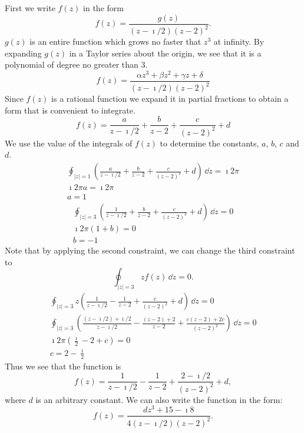 {%
\begin{Solution}
  \label{solution int f = i 2 pi}
  First we write $f(z)$ in the form
  \[
  f(z) = \frac{g(z)}{(z - \imath / 2) (z - 2)^2 }.
  \]
  $g(z)$ is an entire function which grows no faster that $z^3$ at infinity.
  By expanding $g(z)$ in a Taylor series about the origin, we see that 
  it is a polynomial of degree no greater than $3$.  
  \[
  f(z) = \frac{\alpha z^3 + \beta z^2 + \gamma z + \delta}{(z - \imath / 2) (z - 2)^2 }
  \]
  Since $f(z)$ is a rational function we expand it in partial fractions to 
  obtain a form that is convenient to integrate.
  \[
  f(z) = \frac{a}{z - \imath / 2} + \frac{b}{z - 2} + \frac{c}{(z - 2)^2} + d
  \]
  We use the value of the integrals of $f(z)$ to determine the constants, 
  $a$, $b$, $c$ and $d$.
  \begin{gather*}
    \oint_{|z| = 1} \left( \frac{a}{z - \imath / 2} + \frac{b}{z - 2} + \frac{c}{(z-2)^2} + d 
    \right)\,\dd z = \imath 2 \pi 
    \\
    \imath 2 \pi a = \imath 2 \pi 
    \\
    a = 1
  \end{gather*}
  \begin{gather*}
    \oint_{|z| = 3} \left( \frac{1}{z - \imath / 2} + \frac{b}{z - 2} + \frac{c}{(z - 2)^2} + d 
    \right)\,\dd z = 0 
    \\
    \imath 2 \pi (1 + b) = 0 
    \\
    b = -1
  \end{gather*}
  Note that by applying the second constraint, we can change the third 
  constraint to
  \[
  \oint_{|z| = 3} z f(z)\,\dd z = 0.
  \]
  \begin{gather*}
    \oint_{|z| = 3} z \left( \frac{1}{z - \imath / 2} - \frac{1}{z - 2} + \frac{c}{(z - 2)^2} 
      + d \right)\,\dd z = 0 
    \\
    \oint_{|z| = 3} \left( \frac{ (z - \imath / 2) + \imath / 2 }{z - \imath / 2} 
      - \frac{ (z - 2) + 2 }{z - 2} 
      + \frac{ c (z - 2) + 2 c }{(z - 2)^2} \right)\,\dd z = 0 
    \\
    \imath 2 \pi \left( \frac{\imath}{2} - 2 + c \right) = 0 
    \\
    c = 2 - \frac{\imath}{2}
  \end{gather*}
  Thus we see that the function is
  \[
  \boxed{
    f(z) = \frac{1}{z - \imath / 2} - \frac{1}{z - 2} 
    + \frac{ 2 - \imath / 2 }{(z - 2)^2} + d,
    }
  \]
  where $d$ is an arbitrary constant.
  We can also write the function in the form:
  \[
  \boxed{
    f(z) = \frac{ d z^3 + 15 - \imath 8 }{ 4 (z - \imath / 2) (z - 2)^2 }.
    }
  \]


\end{Solution}}
